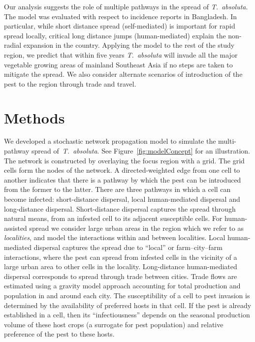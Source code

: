 \documentclass[11pt]{article}
\newcommand{\tuta}{\emph{T.~absoluta}}
\newcommand{\aacomment}[1]{({\color{magenta}AA: #1})}
\theoremstyle{definition}
\begin{document}
Our analysis suggests the role of multiple pathways in the spread
of \tuta{}. The model was evaluated with respect to incidence reports in
Bangladesh. In particular, while short distance spread (self-mediated) is
important for rapid spread locally, critical long distance jumps
(human-mediated) explain the non-radial expansion in the country.  Applying
the model to the rest of the study region, we predict that within five
years \tuta{} will invade all the major vegetable growing areas of mainland
Southeast Asia if no steps are taken to mitigate the spread. We also
consider alternate scenarios of introduction of the pest to the region
through trade and travel. 

\section{Methods}
We developed a stochastic network propagation model to simulate the
multi-pathway spread of~\tuta{}. See Figure~\ref{fig:modelConcept} for an
illustration. The network is constructed by overlaying the focus region
with a grid. The grid cells form the nodes of the network. A
directed-weighted edge from one cell to another indicates that there is a
pathway by which the pest can be introduced from the former to the latter.
There are three pathways in which a cell can become infected:
short-distance dispersal, local human-mediated dispersal and long-distance
dispersal.  Short-distance dispersal captures the spread through natural
means, from an infested cell to its adjacent susceptible cells. For
human-assisted spread we consider large urban areas in the region which we
refer to as {\it localities}, and model the interactions within and between
localities. Local human-mediated dispersal captures the spread due to
``local'' or farm--city--farm interactions, where the pest can spread from
infested cells in the vicinity of a large urban area to other cells in the
locality.  Long-distance human-mediated dispersal corresponds to spread
through trade between cities. Trade flows are estimated using a gravity
model approach accounting for total production and population in and around
each city. The susceptibility of a cell to pest invasion is determined by
the availability of preferred hosts in that cell. If the pest is already
established in a cell, then its ``infectiousness'' depends on the seasonal
production volume of these host crops (a surrogate for pest population) and
relative preference of the pest to these hosts.
\end{document}
